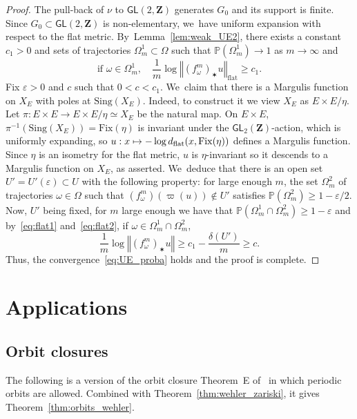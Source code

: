 \documentclass[JEP,XML,SOM,Unicode,published]{cedram}
\newcommand\mto{\mathchoice{\longmapsto}{\mapsto}{\mapsto}{\mapsto}}
\let\e\varepsilon
\newcommand{\norm}[1]{{\left\Vert#1\right\Vert}}
\newcommand{\unsur}[1]{\frac{1}{#1}}
\newcommand{\inv}{^{-1}}
\newcommand{\pp}{\mathbb{P}}\let\P\pp
\def\Z{\mathbf{Z}}
\newcommand{\Sing}{{\mathrm{Sing}}}
\newcommand\GL{{\mathsf{GL}}}
\theoremstyle{plain}
\theoremstyle{definition}
\begin{document}
\begin{proof}
The pull-back of
$\nu$ to $\GL(2, \Z)$ generates $G_0$ and its support is finite. Since $G_0\subset \GL(2, \Z)$ is non-elementary, we~have uniform expansion with respect to the flat metric. By~Lemma~\ref{lem:weak_UE2},
there exists a constant $c_1>0$ and sets of trajectories
$\Omega_m^1\subset \Omega$ such that $\pp(\Omega_m^1)\to 1$ as $m\to \infty$
and
\begin{equation}\label{eq:flat2}
\text{if }\omega\in \Omega_m^1, \quad
\unsur{m}\log \norm{(f_\omega^m)_\varstar u}_{\mathrm{flat}} \geq c_1 .
\end{equation}
Fix $\e>0$ and $c$ such that $0<c<c_1$. We~claim that there is a Margulis function on $X_E$ with poles at
$\Sing(X_E)$.
Indeed, to construct it we view $X_E$ as $E\times E/ \eta$. Let
$\pi:E\times E\to E\times E/\eta \simeq X_E$ be the natural map.
On
$E\times E$, $\pi\inv(\Sing (X_E)) =\mathrm{Fix}(\eta)$ is invariant under the $\GL_2(\Z)$-action, which
is uniformly expanding, so $ u :x\mto - \log d_{\mathrm{flat}}(x, \mathrm{Fix}(\eta))$ defines a
Margulis function. Since $\eta$ is an isometry for the flat metric, $u$ is
$\eta$-invariant so it descends to a Margulis function on $X_E$, as asserted. We~deduce that there is an open set $U' = U'(\e)\subset U$ with the following property:
for large enough $m$,
the set $\Omega_m^2$ of trajectories $\omega\in \Omega$ such that
$(f_\omega^m)(\varpi(u)) \notin U'$ satisfies $\pp(\Omega_m^2)\geq 1-\e/2$. Now,
$U'$ being fixed, for $m$ large enough we have that $\pp(\Omega_m^1\cap \Omega_m^2)\geq 1-\e$ and
by~\eqref{eq:flat1} and~\eqref{eq:flat2}, if $\omega \in \Omega_m^1\cap \Omega_m^2$,
\begin{equation*}
\unsur{m}\log \norm{(f_\omega^m)_\varstar u}\geq c_1 - \frac{\delta(U')}{m}\geq c.
\end{equation*}
Thus, the convergence~\eqref{eq:UE_proba} holds and the proof is complete.
\end{proof}

\section{Applications}\label{sec:applications}

\subsection{Orbit closures}
The following is a version of the orbit closure Theorem~E of~\cite{invariant} in which
periodic orbits are allowed.
Combined with Theorem~\ref{thm:wehler_zariski}, it gives
Theorem~\ref{thm:orbits_wehler}.
\end{document}
